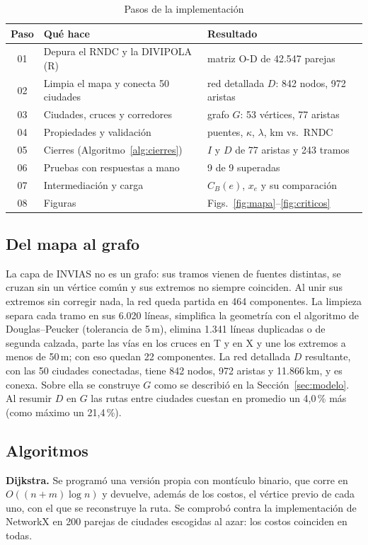 \documentclass[conference]{IEEEtran}
\begin{document}
\begin{table}[t]
\caption{Pasos de la implementación}
\label{tab:pasos}
\centering
\footnotesize
\begin{tabular}{@{}cp{3.1cm}p{3.6cm}@{}}
\toprule
Paso & Qué hace & Resultado \\
\midrule
01 & Depura el RNDC y la DIVIPOLA (R) & matriz O-D de 42.547 parejas \\
02 & Limpia el mapa y conecta 50 ciudades & red detallada $D$: 842 nodos, 972 aristas \\
03 & Ciudades, cruces y corredores & grafo $G$: 53 vértices, 77 aristas \\
04 & Propiedades y validación & puentes, $\kappa$, $\lambda$, km vs.\ RNDC \\
05 & Cierres (Algoritmo~\ref{alg:cierres}) & $I$ y $D$ de 77 aristas y 243 tramos \\
06 & Pruebas con respuestas a mano & 9 de 9 superadas \\
07 & Intermediación y carga & $C_B(e)$, $x_e$ y su comparación \\
08 & Figuras & Figs.~\ref{fig:mapa}--\ref{fig:criticos} \\
\bottomrule
\end{tabular}
\end{table}

\subsection{Del mapa al grafo}
La capa de INVIAS no es un grafo: sus tramos vienen de fuentes distintas, se
cruzan sin un vértice común y sus extremos no siempre coinciden. Al unir sus
extremos sin corregir nada, la red queda partida en 464 componentes. La
limpieza separa cada tramo en sus 6.020 líneas, simplifica la geometría con el
algoritmo de Douglas--Peucker \cite{douglas1973} (tolerancia de 5\,m), elimina
1.341 líneas duplicadas o de segunda calzada, parte las vías en los cruces en
T y en X y une los extremos a menos de 50\,m; con eso quedan 22 componentes. La
red detallada $D$ resultante, con las 50 ciudades conectadas, tiene 842 nodos,
972 aristas y 11.866\,km, y es conexa. Sobre ella se construye $G$ como se
describió en la Sección~\ref{sec:modelo}. Al resumir $D$ en $G$ las rutas entre
ciudades cuestan en promedio un 4,0\,\% más (como máximo un 21,4\,\%).

\subsection{Algoritmos}
\textbf{Dijkstra.} Se programó una versión propia con montículo binario, que
corre en $O((n+m)\log n)$ y devuelve, además de los costos, el vértice previo
de cada uno, con el que se reconstruye la ruta. Se comprobó contra la
implementación de NetworkX \cite{hagberg2008} en 200 parejas de ciudades
escogidas al azar: los costos coinciden en todas.
\end{document}
